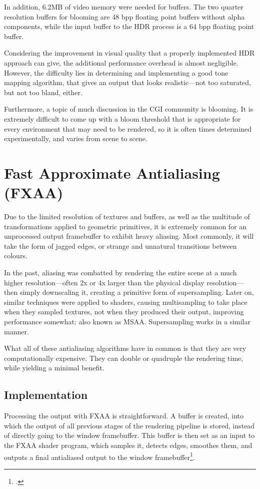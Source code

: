 \documentclass[11pt, oneside]{report}
\begin{document}
In addition, 6.2MB of video memory were needed for buffers. The two quarter resolution buffers for blooming are 48 \gls{bpp} floating point buffers without alpha components, while the input buffer to the HDR process is a 64 \gls{bpp} floating point buffer.

Considering the improvement in visual quality that a properly implemented \gls{HDR} approach can give, the additional performance overhead is almost negligible. However, the difficulty lies in determining and implementing a good \gls{tone mapping} algorithm, that gives an output that looks realistic---not too saturated, but not too bland, either.

Furthermore, a topic of much discussion in the CGI community is blooming. It is extremely difficult to come up with a bloom threshold that is appropriate for every environment that may need to be rendered, so it is often times determined experimentally, and varies from scene to scene.

\chapter{Fast Approximate Antialiasing (FXAA)}
Due to the limited resolution of textures and buffers, as well as the multitude of transformations applied to geometric primitives, it is extremely common for an unprocessed output framebuffer to exhibit heavy \gls{aliasing}. Most commonly, it will take the form of jagged edges, or strange and unnatural transitions between colours.

In the past, aliasing was combatted by rendering the entire scene at a much higher resolution---often 2x or 4x larger than the physical display resolution---then simply downscaling it, creating a primitive form of \gls{supersampling}. Later on, similar techniques were applied to \glspl{shader}, causing \gls{multisampling} to take place when they sampled textures, not when they produced their output, improving performance somewhat; also known as MSAA. Supersampling works in a similar manner.

What all of these antialiasing algorithms have in common is that they are very computationally expensive. They can double or quadruple the rendering time, while yielding a minimal benefit.

\section{Implementation}
Processing the output with \gls{FXAA} is straightforward. A buffer is created, into which the output of all previous stages of the rendering pipeline is stored, instead of directly going to the window framebuffer. This buffer is then set as an input to the \gls{FXAA} \gls{shader} program, which samples it, detects edges, smoothes them, and outputs a final antialiased output to the window framebuffer\footcite{nvidia-fxaa}.
\end{document}
